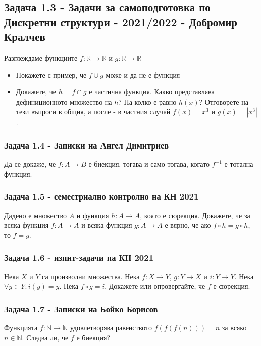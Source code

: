\documentclass[12pt]{article}
\begin{document}
\subsection*{Задача 1.3 - Задачи за самоподготовка по Дискретни структури - 2021/2022 - Добромир Кралчев}
Разглеждаме функциите $f: \mathbb{R} \rightarrow \mathbb{R}$ и $g: \mathbb{R} \rightarrow \mathbb{R}$
\begin{itemize}
    \item Покажете с пример, че $f \cup g$ може и да не е функция
    \item Докажете, че $h = f \cap g$ е частична функция. Какво представлява дефиниционното множество на $h$? На колко е равно $h(x)$? Отговорете на тези въпроси в общия, а после - в частния случай $f(x) = x^3$ и $g(x) = |x^3|$. 
\end{itemize}

\subsubsection*{Задача 1.4 - Записки на Ангел Димитриев}
Да се докаже, че $f: A \rightarrow B$ е биекция, тогава и само тогава, когато $f^{-1}$ е тотална функция.

\subsubsection*{Задача 1.5 - семестриално контролно на КН 2021}
Дадено е множество $A$ и функция $h: A \rightarrow A$, която е сюрекция. Докажете, че за всяка функция $f:A \rightarrow A$ и всяка функция $g:A \rightarrow A$ е вярно, че ако $f \circ h = g \circ h$, то $f = g$.

\subsubsection*{Задача 1.6 - изпит-задачи на КН 2021}
Нека $X$ и $Y$ са произволни множества. Нека $f: X \rightarrow Y$, $g: Y \rightarrow X$ и $i: Y \rightarrow Y$. Нека $\forall y \in Y: i(y) = y$. Нека $f \circ g = i$. Докажете или опровергайте, че $f$ е сюрекция.

\subsubsection*{Задача 1.7 - Записки на Бойко Борисов}
Функцията $f: \mathbb{N} \rightarrow \mathbb{N}$ удовлетворява равенството $f(f(f(n))) = n$ за всяко $n \in \mathbb{N}$. Следва ли, че $f$ е биекция?
\end{document}
